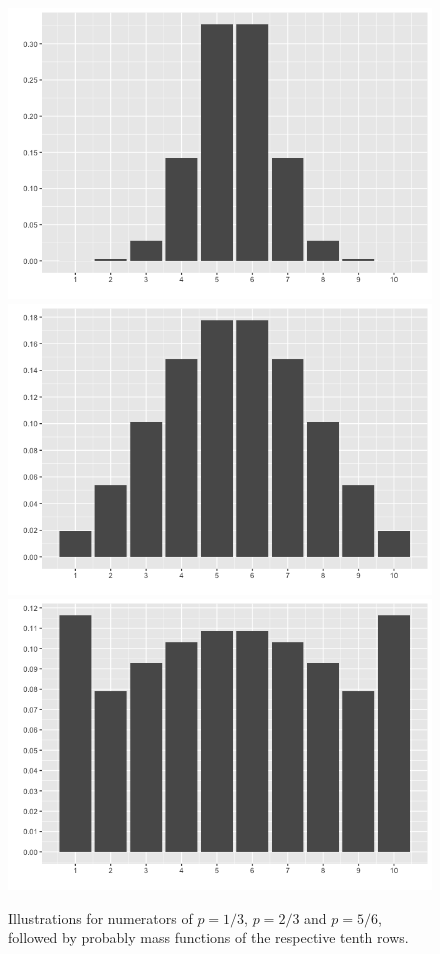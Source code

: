 \documentclass{article}
\begin{document}
\begin{figure}[ht!]
  \noindent
  \includegraphics[width=\textwidth/32*10]{assets/131_problem/p13_10.png}
  \hfill
  \includegraphics[width=\textwidth/32*10]{assets/131_problem/p23_10.png}
  \hfill
  \includegraphics[width=\textwidth/32*10]{assets/131_problem/p56_10.png}
  \caption{
    Illustrations for numerators of $p=1/3$, $p = 2/3$ and $p = 5/6$, followed
    by probably mass functions of the respective tenth rows.
  }
\end{figure}
\end{document}
